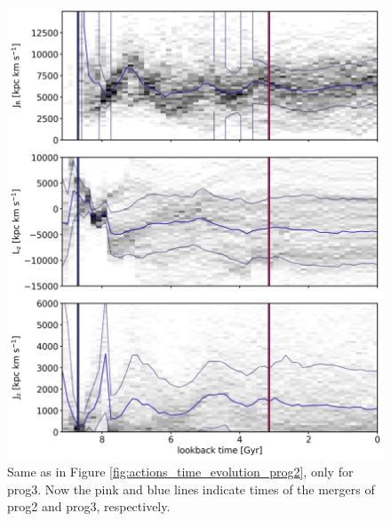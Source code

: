 \begin{figure}
\captionsetup{format=plain}
    \centering
	\includegraphics[width=\textwidth]{plots/Dynamics/prog3/action_time_evolution_hist_mean_prog3.png}
    \caption{Same as in Figure \ref{fig:actions_time_evolution_prog2}, only for prog3. Now the pink and blue lines indicate times of the mergers of prog2 and prog3, respectively. }\label{fig:actions_time_evolution_prog3}
\end{figure}

